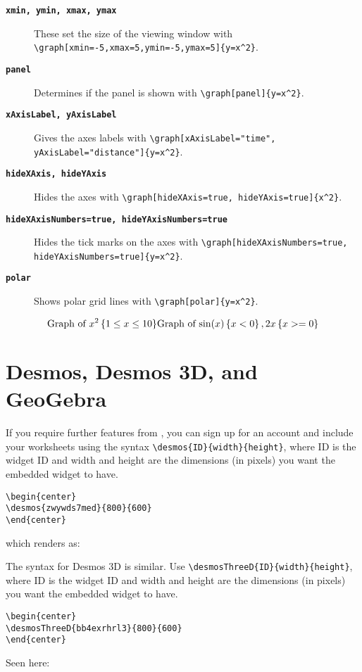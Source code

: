 \documentclass{ximera}
\begin{document}
\begin{description}
  \item[\tt\bfseries xmin, ymin, xmax, ymax] These set the
    size of the viewing window with
    \verb|\graph[xmin=-5,xmax=5,ymin=-5,ymax=5]{y=x^2}|.
  \item[\tt\bfseries panel] Determines if the panel is shown with
    \verb|\graph[panel]{y=x^2}|.
  \item[\tt\bfseries xAxisLabel, yAxisLabel] Gives the axes labels with
    \verb|\graph[xAxisLabel="time", yAxisLabel="distance"]{y=x^2}|.
  \item[\tt\bfseries hideXAxis, hideYAxis] Hides the axes with
    \verb|\graph[hideXAxis=true, hideYAxis=true]{x^2}|.
  \item[\tt\bfseries hideXAxisNumbers=true, hideYAxisNumbers=true] Hides the tick marks on
    the axes with
    \verb|\graph[hideXAxisNumbers=true, hideYAxisNumbers=true]{y=x^2}|.
  \item[\tt\bfseries polar] Shows polar grid lines with \verb|\graph[polar]{y=x^2}|.
\end{description}

\[
  \text{Graph of $x^2 \left\{ 1 \leq x \leq 10 \right\}$}
  \text{Graph of $ \sin(x)\left\{x<0\right\}, 2x\left\{ x>=0 \right\} $}
\]


\section{Desmos, Desmos 3D, and GeoGebra}

If you require further features from
, you can sign up for an account
and include your worksheets using the syntax \verb|\desmos{ID}{width}{height}|, where ID
is the widget ID and width and height are the dimensions (in pixels)
you want the embedded widget to have.
\begin{verbatim}
\begin{center}
\desmos{zwywds7med}{800}{600}
\end{center}
\end{verbatim}
which renders as:
\begin{center}
\end{center}

\providecommand{\desmosThreeD}[3]{}   %

The syntax for Desmos 3D is similar. Use \verb|\desmosThreeD{ID}{width}{height}|, where ID
is the widget ID and width and height are the dimensions (in pixels)
you want the embedded widget to have.
\begin{verbatim}
\begin{center}
\desmosThreeD{bb4exrhrl3}{800}{600}
\end{center}
\end{verbatim}
Seen here:
\begin{center}
  \desmosThreeD{bb4exrhrl3}{800}{600}
\end{center}
\end{document}
